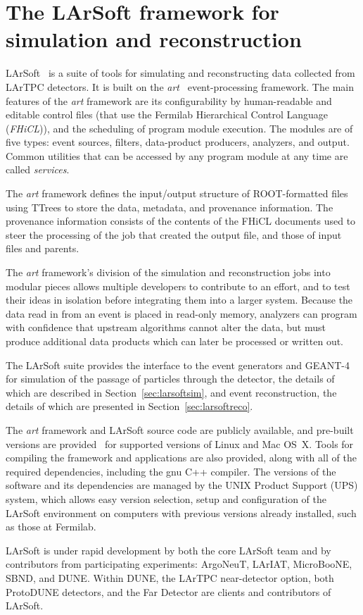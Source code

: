 \section{The LArSoft framework for simulation and reconstruction} 

LArSoft~\cite{larsoft-web} is a suite of tools for simulating and
reconstructing data collected from LArTPC detectors.  It is
built on the \textit{art}~\cite{art-web} event-processing framework.  The
main features of the \textit{art} framework are 
its configurability by
human-readable and editable control files (that use the Fermilab
Hierarchical Control Language (\textit{FHiCL})), and
the scheduling of 
program module execution. The modules are of five types: event sources, filters,
data-product producers, analyzers, and output.  
Common utilities that
can be accessed by any program module at any time are called \textit{services}.

The \textit{art} framework defines the input/output structure of
ROOT-formatted files using TTrees to store the data, metadata, and
provenance information.  The provenance information consists of the
contents of the FHiCL documents used to steer the processing of the
job that created the output file, and those of input files and parents.  

The \textit{ art} framework's division of the simulation and reconstruction
jobs into modular pieces allows multiple developers to contribute to an
effort, and to test their ideas in isolation before integrating them
into a larger system.  Because the data read in from an event is
placed in read-only memory, analyzers can program with confidence that
upstream algorithms cannot alter the data, but must produce additional
data products which can later be processed or written out.

The LArSoft suite provides the interface to the event generators and
GEANT-4~\cite{geant4} 
for simulation of the passage of particles
through the detector, the details of which are described in
Section~\ref{sec:larsoftsim}, and event reconstruction, the details of
which are presented in Section~\ref{sec:larsoftreco}.  

The \textit{art}
framework and LArSoft source code are publicly available, and pre-built
versions are provided~\cite{scisoft-web} for supported versions of Linux and Mac
OS~X.  Tools for compiling the framework and
applications are also provided, along with all of the required
dependencies, including the gnu C++ compiler.  The versions of the
software and its dependencies are managed by the UNIX Product Support (UPS) system,
which allows easy version selection, setup and configuration of the LArSoft
environment on computers with previous versions already installed, such as
those at Fermilab.  

LArSoft is under rapid development by both the
core LArSoft team and by contributors from participating experiments:
ArgoNeuT, LArIAT, MicroBooNE, SBND, and DUNE.  Within DUNE, the LArTPC
near-detector option, both ProtoDUNE detectors, and the Far Detector
are clients and contributors of LArSoft.